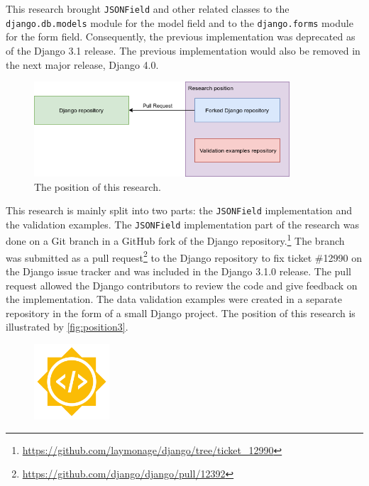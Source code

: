This research brought \verb|JSONField| and other related classes to the
\verb|django.db.models| module for the model field and to the
\verb|django.forms| module for the form field. Consequently, the previous
implementation was deprecated as of the Django 3.1 release. The previous
implementation would also be removed in the next major release, Django 4.0.

\begin{figure}
	\centering
    \includegraphics[width=0.85\textwidth]{pics/position3.png}
	\caption{The position of this research.}
	\label{fig:position3}
\end{figure}

This research is mainly split into two parts: the \verb|JSONField|
implementation and the validation examples. The \verb|JSONField| implementation
part of the research was done on a Git branch in a GitHub fork of the Django
repository.\footnote{\url{https://github.com/laymonage/django/tree/ticket_12990}}
The branch was submitted as a pull
request\footnote{\url{https://github.com/django/django/pull/12392}} to the
Django repository to fix ticket \#12990 on the Django issue tracker
\cite{ticket_12990} and was included in the Django 3.1.0 release. The pull
request allowed the Django contributors to review the code and give feedback on
the implementation. The data validation examples were created in a separate
repository in the form of a small Django project. The position of this research
is illustrated by \autoref{fig:position3}.

\begin{figure}
	\centering
    \includegraphics[width=0.25\textwidth]{pics/GSoC.png}
	\label{fig:gsoc}
\end{figure}


